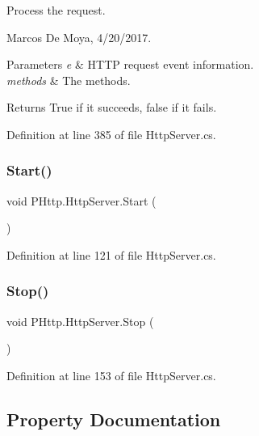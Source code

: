 Process the request. 

Marcos De Moya, 4/20/2017. 


\begin{DoxyParams}{Parameters}
{\em e} & H\+T\+TP request event information. \\
\hline
{\em methods} & The methods. \\
\hline
\end{DoxyParams}


\begin{DoxyReturn}{Returns}
True if it succeeds, false if it fails. 
\end{DoxyReturn}


Definition at line 385 of file Http\+Server.\+cs.

\mbox{\label{class_p_http_1_1_http_server_a28027a98dcfe8619150d883a5912b8e1}} 
\subsubsection{\texorpdfstring{Start()}{Start()}}
{\footnotesize\ttfamily void P\+Http.\+Http\+Server.\+Start (\begin{DoxyParamCaption}{ }\end{DoxyParamCaption})}



Definition at line 121 of file Http\+Server.\+cs.

\mbox{\label{class_p_http_1_1_http_server_a993be74aeea7a301e2c0bbd05882545b}} 
\subsubsection{\texorpdfstring{Stop()}{Stop()}}
{\footnotesize\ttfamily void P\+Http.\+Http\+Server.\+Stop (\begin{DoxyParamCaption}{ }\end{DoxyParamCaption})}



Definition at line 153 of file Http\+Server.\+cs.



\subsection{Property Documentation}
\mbox{\label{class_p_http_1_1_http_server_a9c58a69090a5c6e881f4dbafdd4f3dd9}} 

